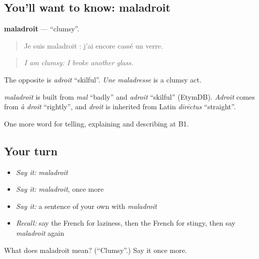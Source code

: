 \subsection*{You'll want to know: maladroit}
\textbf{maladroit} — \textquotedblleft{}clumsy\textquotedblright{}.

\begin{quote}
Je suis maladroit : j'ai encore cassé un verre.
\end{quote}

\begin{quote}
\emph{I am clumsy: I broke another glass.}
\end{quote}

The opposite is \emph{adroit} \textquotedblleft{}skilful\textquotedblright{}. \emph{Une maladresse} is a clumsy act.

\begin{cousinweb}
\emph{maladroit} is built from \emph{mal} \textquotedblleft{}badly\textquotedblright{} and \emph{adroit} \textquotedblleft{}skilful\textquotedblright{} (EtymDB). \emph{Adroit} comes from \emph{à droit} \textquotedblleft{}rightly\textquotedblright{}, and \emph{droit} is inherited from Latin \emph{dīrēctus} \textquotedblleft{}straight\textquotedblright{}.
\end{cousinweb}

\begin{grammarlens}[title={What you've built}]
One more word for telling, explaining and describing at B1.
\end{grammarlens}

\subsection*{Your turn}
\begin{itemize}
\raggedright
  \item \emph{Say it:} \emph{maladroit}
  \item \emph{Say it:} \emph{maladroit}, once more
  \item \emph{Say it:} a sentence of your own with \emph{maladroit}
  \item \emph{Recall:} say the French for laziness, then the French for stingy, then say \emph{maladroit} again
\end{itemize}

\begin{tcolorbox}[breakable,colback=teal!4,colframe=teal!35!black,title={Before you move on}]
What does maladroit mean? (\textquotedblleft{}Clumsy\textquotedblright{}.) Say it once more.
\end{tcolorbox}
